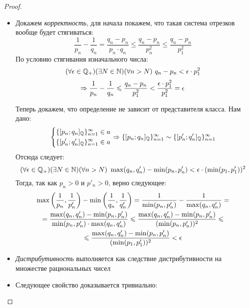 \begin{proof}~

    \begin{itemize}
        \item Докажем \textit{корректность}, для начала
            покажем, что такая система отрезков вообще будет стягиваться:
            \[
                \frac{1}{p_n} - \frac{1}{q_n} =
                \frac{q_n - p_n}{p_n \cdot q_n} \le
                \frac{q_n - p_n}{p^2_n} \le \frac{q_n - p_n}{p^2_1}
            \]
            По условию стягивания изначального числа:
            \[
                (\forall \epsilon \in \mathbb{Q}_+)(\exists N \in \mathbb{N})
                (\forall n > N)\ q_n - p_n < \epsilon \cdot p^2_1
            \]
            \[
                \Rightarrow \frac{1}{p_n} - \frac{1}{q_n} \leqslant
                \frac{q_n - p_n}{p^2_1} <
                \frac{\epsilon \cdot p^2_1}{p^2_1} = \epsilon
            \]
            
            Теперь докажем, что определение не зависит от
            представителя класса. Нам дано:
            \[
                \left\{\begin{aligned}\{[p_n; q_n]_{\mathbb{Q}}\}_{n = 1}^\infty \in a
                    \\ 
                    \{[p'_n; q'_n]_{\mathbb{Q}}\}_{n = 1}^\infty \in a\end{aligned}\right.
                \Rightarrow \{[p_n; q_n]_{\mathbb{Q}}\}_{n = 1}^\infty
                \sim \{[p'_n; q'_n]_{\mathbb{Q}}\}_{n = 1}^\infty
            \]
            Отсюда следует:
            \[
                (\forall \epsilon \in \mathbb{Q}_+)(\exists N \in \mathbb{N})
                (\forall n > N)\ \max(q_n, q'_n) - \min(p_n, p'_n) < \epsilon
                \cdot (\min(p_1, p'_1))^2
            \]
            Тогда, так как $p_n > 0$ и $p'_n > 0$, верно следующее:
            \begin{multline*}
                \max\left(\frac{1}{p_n}, \frac{1}{p'_n}\right) -
                \min\left(\frac{1}{q_n}, \frac{1}{q'_n}\right) =
                \frac{1}{\min(p_n, p'_n)} - \frac{1}{\max(q_n, q'_n)} =\\
                = \frac{\max(q_n, q'_n) - \min(p_n, p'_n)}{\min(p_n, p'_n)
                \cdot \max(q_n, q'_n)} \leqslant \frac{\max(q_n, q'_n) - \min(p_n, p'_n)}
                {(\min(p_n, p'_n))^2} \leqslant \\
                \leqslant \frac{\max(q_n, q'_n) - \min(p_n, p'_n)}
                {(\min(p_1, p'_1))^2} < \epsilon
            \end{multline*}
        \item \textit{Дистрибутивность} выполняется как следствие
            дистрибутивности на множестве рациональных чисел
        \item Следующее свойство доказывается тривиально:
            

\end{itemize}
\end{proof}
